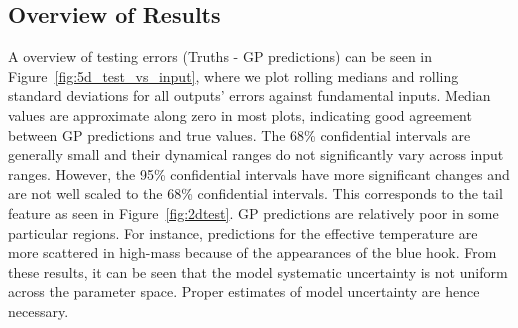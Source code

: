 \subsection{Overview of Results}

A overview of testing errors (Truths - GP predictions) can be seen in Figure~\ref{fig:5d_test_vs_input}, where we plot rolling medians and rolling standard deviations for all outputs' errors against fundamental inputs.
%
Median values are approximate along zero in most plots, indicating good agreement between GP predictions and true values. The 68\% confidential intervals are generally small and their dynamical ranges do not significantly vary across input ranges. 
%
However, the 95\% confidential intervals have more significant changes and are not well scaled to the 68\% confidential intervals. This corresponds to the tail feature as seen in Figure~\ref{fig:2dtest}. GP predictions are relatively poor in some particular regions. For instance, predictions for the effective temperature are more scattered in high-mass because of the appearances of the blue hook. 
%
From these results, it can be seen that the model systematic uncertainty is not uniform across the parameter space. Proper estimates of model uncertainty are hence necessary. 


